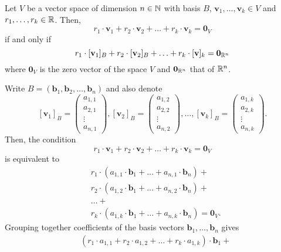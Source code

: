 \begin{lemma}{}{}
 Let $V$ be a vector space of dimension $n \in \mathbb{N}$ with basis $B$,
 $\mathbf{v}_1,\ldots,\mathbf{v}_k \in V$ and $r_1,\ldots,r_k \in \mathbb{R}$. Then,
 \[
  r_1 \cdot \mathbf{v}_1 + r_2 \cdot \mathbf{v}_2 + \ldots + r_k \cdot
  \mathbf{v}_k = \mathbf{0}_V
 \]
 if and only if
 \[
  r_1 \cdot [\mathbf{v}_1]_B + r_2 \cdot [\mathbf{v}_2]_B + \ldots + r_k \cdot
  [\mathbf{v}]_k = \mathbf{0}_{\mathbb{R}^{n}}
 \]
 where $\mathbf{0}_V$ is the zero vector of the space $V$ and
 $\mathbf{0}_{\mathbb{R}^{n}}$ that of $\mathbb{R}^{n}$.
\end{lemma}
\begin{lemproof}
 Write $B = (\mathbf{b}_1,\mathbf{b}_2,\ldots,\mathbf{b}_n)$ and also denote
 \[
  [\mathbf{v}_1]_B = 
  \begin{pmatrix}
   a_{1,1}\\
   a_{2,1}\\
   \vdots\\
   a_{n,1}
  \end{pmatrix},
  [\mathbf{v}_2]_B =
  \begin{pmatrix}
   a_{1,2}\\
   a_{2,2}\\
   \vdots\\
   a_{n,2}
  \end{pmatrix},\ldots,[\mathbf{v}_k]_B = 
  \begin{pmatrix}
   a_{1,k}\\
   a_{2,k}\\
   \vdots\\
   a_{n,k}
  \end{pmatrix}.
 \]
 Then, the condition
 \[
  r_1 \cdot \mathbf{v}_1 + r_2 \cdot \mathbf{v}_2 + \ldots + r_k \cdot
  \mathbf{v}_k = \mathbf{0}_V
 \]
 is equivalent to
 \begin{align*}
  &r_1 \cdot (a_{1,1} \cdot \mathbf{b}_1 + \ldots + a_{n,1} \cdot \mathbf{b}_n)
  +\\
  &r_2 \cdot (a_{1,2} \cdot \mathbf{b}_1 + \ldots + a_{n,2} \cdot \mathbf{b}_n)
  +\\
  &\ldots +\\
  &r_k \cdot (a_{1,k} \cdot \mathbf{b}_1 + \ldots + a_{n,k} \cdot \mathbf{b}_n) =
  \mathbf{0}_V.
 \end{align*}
 Grouping together coefficients of the basis vectors
 $\mathbf{b}_1,\ldots,\mathbf{b}_n$ gives
 \begin{align*}
  &(r_1 \cdot a_{1,1} + r_2 \cdot a_{1,2} + \ldots + r_k \cdot a_{1,k}) \cdot
  \mathbf{b}_1 +\\

\end{align*}
\end{lemproof}
